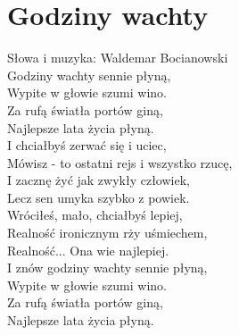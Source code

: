 \section{Godziny wachty}

Słowa i muzyka: Waldemar Bocianowski\\

Godziny wachty sennie płyną, \\
Wypite w głowie szumi wino. \\
Za rufą światła portów giną, \\
Najlepsze lata życia płyną. \\

I chciałbyś zerwać się i uciec, \\
Mówisz - to ostatni rejs i wszystko rzucę, \\
I zacznę żyć jak zwykły człowiek, \\
Lecz sen umyka szybko z powiek. \\

Wróciłeś, mało, chciałbyś lepiej, \\
Realność ironicznym rży uśmiechem, \\
Realność... Ona wie najlepiej. \\

I znów godziny wachty sennie płyną, \\
Wypite w głowie szumi wino. \\
Za rufą światła portów giną, \\
Najlepsze lata życia płyną. \\